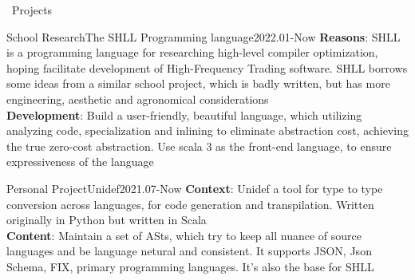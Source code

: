 \documentclass{resume}
\begin{document}
\begin{rSection}{\faUsers~Projects}
    \begin{rProject}{School Research}{The SHLL Programming language}{2022.01-Now}
        \textbf{Reasons}: SHLL is a programming language for researching high-level compiler optimization, hoping facilitate development of High-Frequency Trading software. SHLL borrows some ideas from a similar school project, which is badly written, but has more engineering, aesthetic and agronomical considerations\\
        \textbf{Development}: Build a user-friendly, beautiful language, which utilizing analyzing code, specialization and inlining to eliminate abstraction cost, achieving the true zero-cost abstraction. Use scala 3 as the front-end language, to ensure expressiveness of the language
    \end{rProject}
    \begin{rProject}{Personal Project}{Unidef}{2021.07-Now}
        \textbf{Context}: Unidef a tool for type to type conversion across languages, for code generation and transpilation. Written originally in Python but written in Scala\\
        \textbf{Content}: Maintain a set of ASts, which try to keep all nuance of source languages and be language netural and consistent. It supports JSON, Json Schema, FIX, primary programming languages. It's also the base for SHLL
    \end{rProject}


\end{rSection}
\end{document}
